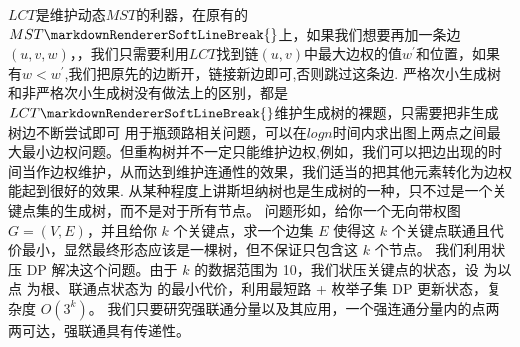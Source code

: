 {}
\markdownRendererSectionEnd \markdownRendererSectionBegin
{}\markdownRendererInterblockSeparator
{}$ LCT $是维护动态$ MST $的利器，在原有的$ MST\markdownRendererSoftLineBreak
{}$上，如果我们想要再加一条边$ (u,v,w) $，，我们只需要利用$ LCT $找到链$ (u,v) $中最大边权的值$ w^{'} $和位置，如果有$ w<w^{'} $,我们把原先的边断开，链接新边即可,否则跳过这条边.\markdownRendererInterblockSeparator
{}\markdownRendererSectionBegin
{}\markdownRendererInterblockSeparator
{}严格次小生成树和非严格次小生成树没有做法上的区别，都是$ LCT\markdownRendererSoftLineBreak
{}$维护生成树的裸题，只需要把非生成树边不断尝试即可\markdownRendererInterblockSeparator
{}
\markdownRendererSectionEnd 
\markdownRendererSectionEnd \markdownRendererSectionBegin
{}\markdownRendererInterblockSeparator
{}用于瓶颈路相关问题，可以在$ logn $时间内求出图上两点之间最大最小边权问题。但重构树并不一定只能维护边权,例如，我们可以把边出现的时间当作边权维护，从而达到维护连通性的效果，我们适当的把其他元素转化为边权能起到很好的效果.\markdownRendererInterblockSeparator
{}\markdownRendererInterblockSeparator
{}
\markdownRendererSectionEnd \markdownRendererSectionBegin
{}\markdownRendererInterblockSeparator
{}从某种程度上讲斯坦纳树也是生成树的一种，只不过是一个关键点集的生成树，而不是对于所有节点。\markdownRendererParagraphSeparator
{}问题形如，给你一个无向带权图 $G=(V,E)$，并且给你 $k$ 个关键点，求一个边集 $E$ 使得这 $k$ 个关键点联通且代价最小，显然最终形态应该是一棵树，但不保证只包含这 $k$ 个节点。\markdownRendererParagraphSeparator
{}我们利用状压 DP 解决这个问题。由于 $k$ 的数据范围为 10，我们状压关键点的状态，设  为以点  为根、联通点状态为  的最小代价，利用最短路 + 枚举子集 DP 更新状态，复杂度 $O(3^k)$。\markdownRendererInterblockSeparator
{}\markdownRendererInterblockSeparator
{}
\markdownRendererSectionEnd 
\markdownRendererSectionEnd \markdownRendererSectionBegin
{}\markdownRendererInterblockSeparator
{}\markdownRendererSectionBegin
{}\markdownRendererInterblockSeparator
{}我们只要研究强联通分量以及其应用，一个强连通分量内的点两两可达，强联通具有传递性。\markdownRendererInterblockSeparator
